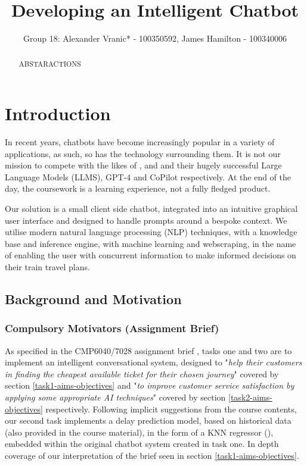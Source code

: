\documentclass[11pt]{article}
\title{Developing an Intelligent Chatbot}
\author{Group 18: Alexander Vranic* - 100350592, James Hamilton - 100340006}
\begin{document}
\maketitle


\begin{abstract} \label{abstract}
    ABSTARACTIONS

\end{abstract}




\section{Introduction} \label{introduction}

In recent years, chatbots have become increasingly popular in a variety of applications, as such, so has the technology surrounding them. It is not our mission to compete with the likes of \cite{openai}, \cite{microsoft} and \cite{github} and their hugely successful Large Language Models (LLMS), GPT-4 \cite{gpt4} and CoPilot \cite{copilot} respectively. At the end of the day, the coursework is a learning experience, not a fully fledged product.

Our solution is a small client side chatbot, integrated into an intuitive graphical user interface and designed to handle prompts around a bespoke context. We utilise modern natural language processing (NLP) techniques, with a knowledge base and inference engine, with machine learning and webscraping, in the name of enabling the user with concurrent information to make informed decisions on their train travel plans.


\subsection{Background and Motivation} \label{background}

\subsubsection{Compulsory Motivators (Assignment Brief)} \label{compulsory-motivators}

As specified in the CMP6040/7028 assignment brief \cite{AI2018CW}, tasks one and two are to implement an intelligent conversational system, designed to "\textit{help their customers in finding the cheapest available ticket for their chosen journey}" covered by section \ref{task1-aims-objectives} and "\textit{to improve customer service satisfaction by applying some appropriate AI techniques}" covered by section \ref{task2-aims-objectives} respectively. Following implicit suggestions from the course contents, our second task implements a delay prediction model, based on historical data (also provided in the course material), in the form of a KNN regressor (\cite{knn-origin}), embedded within the original chatbot system created in task one. In depth coverage of our interpretation of the brief seen in section \ref{task1-aims-objectives}.
\end{document}
